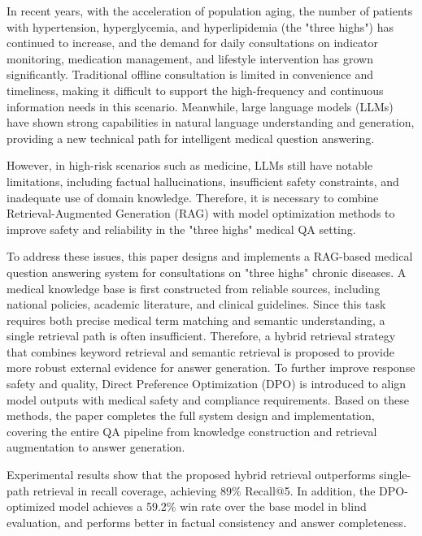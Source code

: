 \begin{englishabstract}
In recent years, with the acceleration of population aging, the number of patients with hypertension, hyperglycemia, and hyperlipidemia (the "three highs") has continued to increase, and the demand for daily consultations on indicator monitoring, medication management, and lifestyle intervention has grown significantly. Traditional offline consultation is limited in convenience and timeliness, making it difficult to support the high-frequency and continuous information needs in this scenario. Meanwhile, large language models (LLMs) have shown strong capabilities in natural language understanding and generation, providing a new technical path for intelligent medical question answering.

However, in high-risk scenarios such as medicine, LLMs still have notable limitations, including factual hallucinations, insufficient safety constraints, and inadequate use of domain knowledge. Therefore, it is necessary to combine Retrieval-Augmented Generation (RAG) with model optimization methods to improve safety and reliability in the "three highs" medical QA setting.

To address these issues, this paper designs and implements a RAG-based medical question answering system for consultations on "three highs" chronic diseases. A medical knowledge base is first constructed from reliable sources, including national policies, academic literature, and clinical guidelines. Since this task requires both precise medical term matching and semantic understanding, a single retrieval path is often insufficient. Therefore, a hybrid retrieval strategy that combines keyword retrieval and semantic retrieval is proposed to provide more robust external evidence for answer generation. To further improve response safety and quality, Direct Preference Optimization (DPO) is introduced to align model outputs with medical safety and compliance requirements. Based on these methods, the paper completes the full system design and implementation, covering the entire QA pipeline from knowledge construction and retrieval augmentation to answer generation.

Experimental results show that the proposed hybrid retrieval outperforms single-path retrieval in recall coverage, achieving 89\% Recall@5. In addition, the DPO-optimized model achieves a 59.2\% win rate over the base model in blind evaluation, and performs better in factual consistency and answer completeness.

\end{englishabstract}
